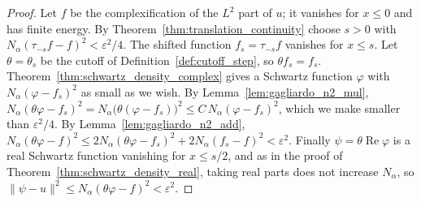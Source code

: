 \begin{proof}
\leanok
Let $f$ be the complexification of the $L^2$ part of $u$; it vanishes for $x \le 0$ and has finite energy. By Theorem~\ref{thm:translation_continuity} choose $s > 0$ with $N_\alpha(\tau_{-s} f - f)^2 < \varepsilon^2/4$. The shifted function $f_s = \tau_{-s} f$ vanishes for $x \le s$. Let $\theta = \theta_s$ be the cutoff of Definition~\ref{def:cutoff_step}, so $\theta f_s = f_s$. Theorem~\ref{thm:schwartz_density_complex} gives a Schwartz function $\varphi$ with $N_\alpha(\varphi - f_s)^2$ as small as we wish. By Lemma~\ref{lem:gagliardo_n2_mul}, $N_\alpha(\theta\varphi - f_s)^2 = N_\alpha\bigl(\theta(\varphi - f_s)\bigr)^2 \le C\, N_\alpha(\varphi - f_s)^2$, which we make smaller than $\varepsilon^2/4$. By Lemma~\ref{lem:gagliardo_n2_add}, $N_\alpha(\theta\varphi - f)^2 \le 2 N_\alpha(\theta\varphi - f_s)^2 + 2 N_\alpha(f_s - f)^2 < \varepsilon^2$. Finally $\psi = \theta \operatorname{Re}\varphi$ is a real Schwartz function vanishing for $x \le s/2$, and as in the proof of Theorem~\ref{thm:schwartz_density_real}, taking real parts does not increase $N_\alpha$, so $\lVert \psi - u \rVert^2 \le N_\alpha(\theta\varphi - f)^2 < \varepsilon^2$.
\end{proof}
